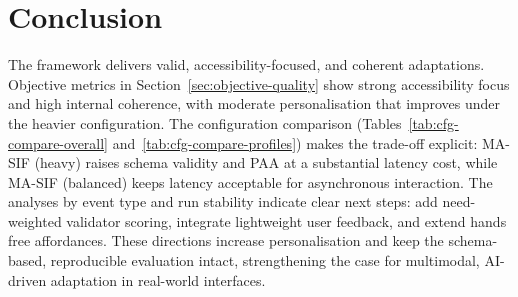 \section{Conclusion}
The framework delivers valid, accessibility-focused, and coherent adaptations. Objective metrics in Section~\ref{sec:objective-quality} show strong accessibility focus and high internal coherence, with moderate personalisation that improves under the heavier configuration. The configuration comparison (Tables~\ref{tab:cfg-compare-overall} and~\ref{tab:cfg-compare-profiles}) makes the trade-off explicit: MA-SIF (heavy) raises schema validity and PAA at a substantial latency cost, while MA-SIF (balanced) keeps latency acceptable for asynchronous interaction. The analyses by event type and run stability indicate clear next steps: add need-weighted validator scoring, integrate lightweight user feedback, and extend hands free affordances. These directions increase personalisation and keep the schema-based, reproducible evaluation intact, strengthening the case for multimodal, AI-driven adaptation in real-world interfaces.